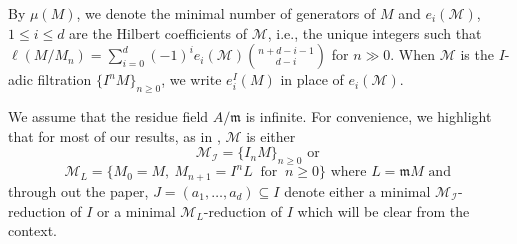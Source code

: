 \documentclass[11pt,reqno]{amsart}
\theoremstyle{definition}
\newcommand{\m}{\mathfrak m}
\def\N{{\mathcal N}}
\def\F{{\mathcal F}}
\def\M{{\mathcal M}}
\def\I{{\mathcal I}}
\numberwithin{equation}{section}
\begin{document}
By $\mu(M)$, we denote the minimal number of generators of $M$ and $e_i(\M)$, $1\leq i\leq d$ are the Hilbert coefficients of $\M$, i.e., the unique integers such that $\ell(M/M_n)=\sum\limits_{i=0}^d(-1)^ie_i(\M)\binom{n+d-i-1}{d-i}$ for $n\gg 0.$ When $\M$ is the $I$-adic filtration $\{I^nM\}_{n\geq 0}$, we write $e_i^I(M)$ in place of $e_i(\M)$. 

We assume that the residue field $A/\m$ is infinite. For convenience, we highlight that for most of our results, as in \cite{rossi-valla}, $\M$ is either $$\M_\I=\{I_nM\}_{n\geq 0}\text{ or }$$ $$\M_L=\{M_0=M, ~M_{n+1}=I^nL ~\text{ for } ~n\geq 0\} \text{ where } L=\m M 
\text{ and }$$
through out the paper, $J=(a_1,\ldots,a_d)\subseteq I$ denote either a minimal $\M_\I$-reduction of $I$ or a minimal $\M_L$-reduction of $I$ which will be clear from the context. 





\end{document}
